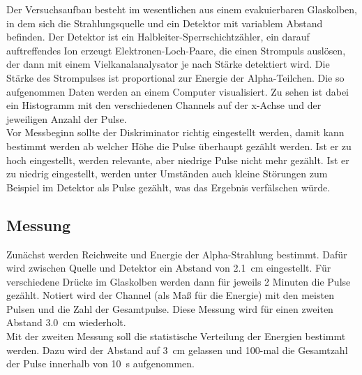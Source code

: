 Der Versuchsaufbau besteht im wesentlichen aus einem evakuierbaren Glaskolben, in dem sich die Strahlungsquelle und ein Detektor mit variablem Abstand befinden. Der Detektor ist ein Halbleiter-Sperrschichtzähler, ein darauf auftreffendes Ion erzeugt Elektronen-Loch-Paare, die einen Strompuls auslösen, der dann mit einem Vielkanalanalysator je nach Stärke detektiert wird. Die Stärke des Strompulses ist proportional zur Energie der Alpha-Teilchen. Die so aufgenommen Daten werden an einem Computer visualisiert. Zu sehen ist dabei ein Histogramm mit den verschiedenen Channels auf der x-Achse und der jeweiligen Anzahl der Pulse. \\
Vor Messbeginn sollte der Diskriminator richtig eingestellt werden, damit kann bestimmt werden ab welcher Höhe die Pulse überhaupt gezählt werden. Ist er zu hoch eingestellt, werden relevante, aber niedrige Pulse nicht mehr gezählt. Ist er zu niedrig eingestellt, werden unter Umständen auch kleine Störungen zum Beispiel im Detektor als Pulse gezählt, was das Ergebnis verfälschen würde.
\subsection*{Messung}
Zunächst werden Reichweite und Energie der Alpha-Strahlung bestimmt. Dafür wird zwischen Quelle und Detektor ein Abstand von \SI{2.1}{\centi\meter} eingestellt. Für verschiedene Drücke im Glaskolben werden dann für jeweils 2 Minuten die Pulse gezählt. Notiert wird der Channel (als Maß für die Energie) mit den meisten Pulsen und die Zahl der Gesamtpulse. Diese Messung wird für einen zweiten Abstand \SI{3.0}{\centi\meter} wiederholt. \\
Mit der zweiten Messung soll die statistische Verteilung der Energien bestimmt werden. Dazu wird der Abstand auf \SI{3}{\centi\meter} gelassen und 100-mal die Gesamtzahl der Pulse innerhalb von \SI{10}{\second} aufgenommen.
